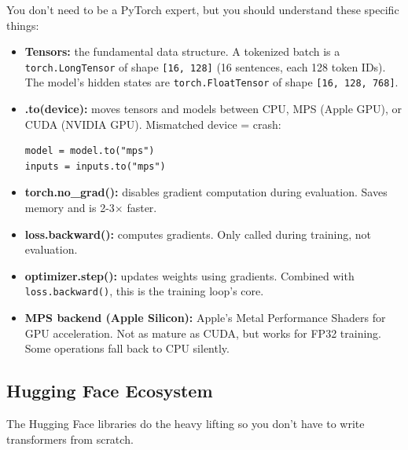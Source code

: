 You don't need to be a PyTorch expert, but you should understand these specific things:

\begin{itemize}[nosep]
    \item \textbf{Tensors:} the fundamental data structure. A tokenized batch is a \texttt{torch.LongTensor} of shape \texttt{[16, 128]} (16 sentences, each 128 token IDs). The model's hidden states are \texttt{torch.FloatTensor} of shape \texttt{[16, 128, 768]}.
    \item \textbf{.to(device):} moves tensors and models between CPU, MPS (Apple GPU), or CUDA (NVIDIA GPU). Mismatched device = crash:
\begin{verbatim}
model = model.to("mps")
inputs = inputs.to("mps")
\end{verbatim}
    \item \textbf{torch.no\_grad():} disables gradient computation during evaluation. Saves memory and is 2-3$\times$ faster.
    \item \textbf{loss.backward():} computes gradients. Only called during training, not evaluation.
    \item \textbf{optimizer.step():} updates weights using gradients. Combined with \texttt{loss.backward()}, this is the training loop's core.
    \item \textbf{MPS backend (Apple Silicon):} Apple's Metal Performance Shaders for GPU acceleration. Not as mature as CUDA, but works for FP32 training. Some operations fall back to CPU silently.
\end{itemize}

\subsection{Hugging Face Ecosystem}

The Hugging Face libraries do the heavy lifting so you don't have to write transformers from scratch.

